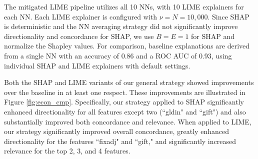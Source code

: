 \documentclass[12pt]{article}  %
\begin{document}
The mitigated LIME pipeline utilizes all 10 NNs, with 10 LIME explainers for each NN. Each LIME explainer is configured with $\nu = N = 10,000$. Since SHAP is deterministic and the NN averaging strategy did not significantly improve directionality and concordance for SHAP, we use $B = E = 1$ for SHAP and normalize the Shapley values. For comparison, baseline explanations are derived from a single NN with an accuracy of 0.86 and a ROC AUC of 0.93, using individual SHAP and LIME explainers with default settings.




    Both the SHAP and LIME variants of our general strategy showed improvements over the baseline in at least one respect. These improvements are illustrated in Figure \ref{fig:econ_cmp}. Specifically, our strategy applied to SHAP significantly enhanced directionality for all features except two (``gldin" and ``gift") and also substantially improved both concordance and relevance. When applied to LIME, our strategy significantly improved overall concordance, greatly enhanced directionality for the features ``fixadj" and ``gift," and significantly increased relevance for the top 2, 3, and 4 features.%

     
\end{document}
